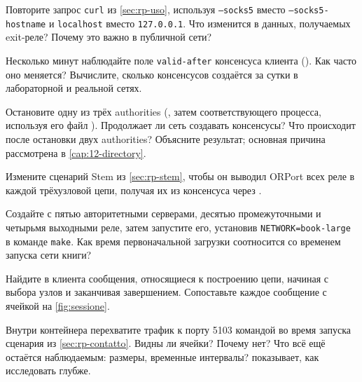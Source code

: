 \begin{esercizio}[1]\label{es:19-socks}
Повторите запрос \texttt{curl} из \cref{sec:rp-uso}, используя \texttt{--socks5} вместо \texttt{--socks5-hostname} и \texttt{localhost} вместо \texttt{127.0.0.1}. Что изменится в данных, получаемых exit-реле? Почему это важно в публичной сети?
\end{esercizio}

\begin{esercizio}[2]\label{es:19-consenso}
Несколько минут наблюдайте поле \texttt{valid-after} консенсуса клиента (). Как часто оно меняется? Вычислите, сколько консенсусов создаётся за сутки в лабораторной и реальной сетях.
\end{esercizio}

\begin{esercizio}[2]\label{es:19-autorita}
Остановите одну из трёх authorities (, затем  соответствующего процесса, используя его файл ). Продолжает ли сеть создавать консенсусы? Что происходит после остановки двух authorities? Объясните результат; основная причина рассмотрена в \cref{cap:12-directory}.
\end{esercizio}

\begin{esercizio}[2]\label{es:19-stem}
Измените сценарий Stem из \cref{sec:rp-stem}, чтобы он выводил ORPort всех реле в каждой трёхузловой цепи, получая их из консенсуса через .
\end{esercizio}

\begin{esercizio}[2]\label{es:19-rete}
Создайте  с пятью авторитетными серверами, десятью промежуточными и четырьмя выходными реле, затем запустите его, установив \texttt{NETWORK=book-large} в команде \texttt{make}. Как время первоначальной загрузки соотносится со временем запуска сети книги?
\end{esercizio}

\begin{esercizio}[3]\label{es:19-log}
Найдите в  клиента сообщения, относящиеся к построению цепи, начиная с выбора узлов и заканчивая завершением. Сопоставьте каждое сообщение с ячейкой на \cref{fig:sessione}.
\end{esercizio}

\begin{esercizio}[3]\label{es:19-cattura}
Внутри контейнера перехватите трафик к порту 5103 командой  во время запуска сценария из \cref{sec:rp-contatto}. Видны ли ячейки? Почему нет? Что всё ещё остаётся наблюдаемым: размеры, временные интервалы?  показывает, как исследовать глубже.
\end{esercizio}

